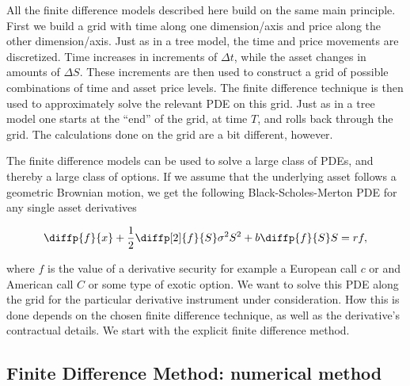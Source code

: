\begin{frame}[t]{\secname}
All the finite difference models described here build on the same main principle. First we build a grid with time along one dimension/axis and price along the other dimension/axis. Just as in a tree model, the time and price movements are discretized. Time increases in increments of $\Delta t$, while the asset changes in amounts of $\Delta S$. These increments are then used to construct a grid of possible combinations of time and asset price levels. The finite difference technique is then used to approximately solve the relevant PDE on this grid. Just as in a tree model one starts at the ``end'' of the grid, at time $T$, and rolls back through the grid. The calculations done on the grid are a bit different, however.

The finite difference models can be used to solve a large class of PDEs, and thereby a large class of options. If we assume that the underlying asset follows a geometric Brownian motion, we get the following Black-Scholes-Merton PDE for any single asset derivatives

\begin{equation}\label{eq:bsmpde}
\diffp{f}{x}+\frac{1}{2}\diffp[2]{f}{S}\sigma^{2}S^{2}+b\diffp{f}{S}S=rf,
\end{equation}
\end{frame}

\begin{frame}
where $f$ is the value of a derivative security for example a European call $c$ or and American call $C$ or some type of exotic option. We want to solve this PDE along the grid for the particular derivative instrument under consideration. How this is done depends on the chosen finite difference technique, as well as the derivative's contractual details. We start with the explicit finite difference method.
\end{frame}

\subsection{\alert{Finite Difference Method}: numerical method}


